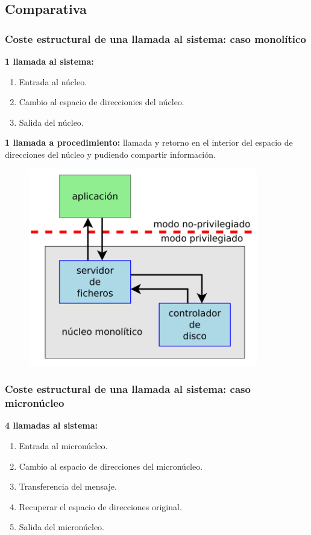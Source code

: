 \documentclass{article}
\begin{document}
\newpage
\subsection{Comparativa}
\subsubsection{Coste estructural de una llamada al sistema: caso monolítico}
\textbf{1 llamada al sistema:}
\begin{enumerate}
\item Entrada al núcleo.

\item Cambio al espacio de direccionies del núcleo.

\item Salida del núcleo.
\end{enumerate}

\textbf{1 llamada a procedimiento:} llamada y retorno en el interior del espacio de direcciones del núcleo y pudiendo compartir información.

\begin{figure}[h]
\centering
\includegraphics[scale=1,width=100mm]{llamada_sistema.png}
\end{figure}
\newpage

\subsubsection{Coste estructural de una llamada al sistema: caso micronúcleo}
\textbf{4 llamadas al sistema:}
\begin{enumerate}
\item Entrada al micronúcleo.

\item Cambio al espacio de direcciones del micronúcleo.

\item Transferencia del mensaje.

\item Recuperar el espacio de direcciones original.

\item Salida del micronúcleo.
\end{enumerate}
\end{document}

